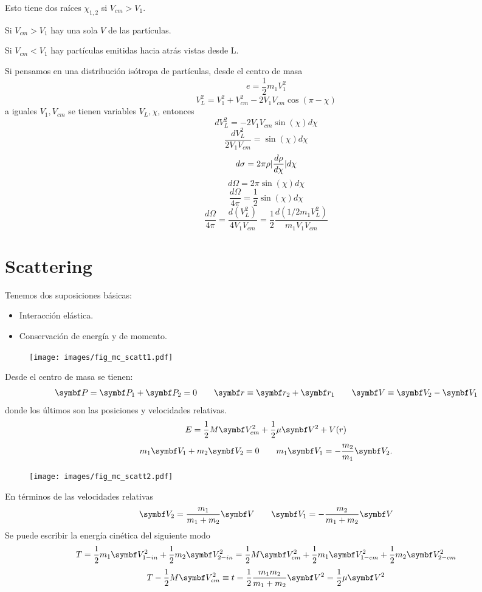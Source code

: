 \documentclass[10pt,oneside]{CBFT_book}
\begin{document}
Esto tiene dos raíces $\chi_{1,2}$ si $ V_{cm} > V_1$. 

Si $ V_{cm} > V_1$ hay una sola $V$ de las partículas.

Si $ V_{cm} < V_1$ hay partículas emitidas hacia atrás vistas desde L.

Si pensamos en una distribución isótropa de partículas, desde el centro de masa
\[
	e = \frac{1}{2} m_1 V_{1}^2
\]
\[
	V_L^2 = V_1^2 + V_{cm}^2 - 2 V_1 V_{cm} \cos( \pi -\chi )
\]
a iguales $V_1,V_{cm}$ se tienen variables $V_L, \chi$, entonces
\[
	dV_L^2 = - 2 V_1 V_{cm} \sin(\chi) d\chi
\]
\[
	\frac{dV_L^2}{2 V_1 V_{cm}} = \sin( \chi) d\chi 
\]
\[
	d\sigma = 2 \pi \rho |\frac{d^{\hspace{-0.05em}} {\rho}}{d {\chi}^{\hspace{-0.05em}}}| d\chi 
\]
\[
	d\Omega = 2 \pi \sin( \chi ) d\chi 
\]
\[
	\frac{d\Omega}{4\pi} = \frac{1}{2} \sin( \chi ) d\chi 
\]
\[
	\frac{d\Omega}{4\pi} =  \frac{d (V_L^2) }{4 V_1 V_{cm}} = \frac{1}{2} \frac{d ( 1/2 m_1 V_L^2) }{m_1 V_1 V_{cm}} 
\]

\section{Scattering}

Tenemos dos suposiciones básicas:
	\begin{itemize}
		\item Interacción elástica.
		\item Conservación de energía y de momento.
	\end{itemize}

\begin{figure}[htb]
	\begin{center}
	\texttt{[image: images/fig\_mc\_scatt1.pdf]}	 
	\end{center}
	\caption{}
\end{figure} 	
	
Desde el centro de masa se tienen:
\[
	\vb{P} = \vb{P}_1 + \vb{P}_2 = 0	\qquad		\vb{r} \equiv \vb{r}_2 + \vb{r}_1
	\qquad		\vb{V} \equiv \vb{V}_2 - \vb{V}_1
\]
donde los últimos son las posiciones y velocidades relativas.
\[
	E = \frac{1}{2} M \vb{V}_{cm}^2 + \frac{1}{2} \mu \vb{V}^2 + V(r)
\]
\[
	m_1 \vb{V}_1 + m_2 \vb{V}_2 = 0 \qquad m_1 \vb{V}_1 = -\frac{m_2}{m_1} \vb{V}_2.
\]
\begin{figure}[htb]
	\begin{center}
	\texttt{[image: images/fig\_mc\_scatt2.pdf]}	 
	\end{center}
	\caption{}
\end{figure} 
En términos de las velocidades relativas
\[
	\vb{V}_2 = \frac{m_1}{m_1 + m_2} \vb{V} \qquad \vb{V}_1 = -\frac{m_2}{m_1 + m_2} \vb{V}
\]
Se puede escribir la energía cinética del siguiente modo
\[
	T = \frac{1}{2} m_1 \vb{V}_{1-in}^2 + \frac{1}{2} m_2 \vb{V}_{2-in}^2 =
	\frac{1}{2} M \vb{V}_{cm}^2 + \frac{1}{2} m_1 \vb{V}_{1-cm}^2 + \frac{1}{2} m_2 \vb{V}_{2-cm}^2 
\]
\[
	T - \frac{1}{2} M \vb{V}_{cm}^2 \equiv t = \frac{1}{2} \frac{m_1 m_2}{m_1 + m_2} \vb{V}^2 =
							\frac{1}{2} \mu \vb{V}^2
\]
\end{document}
